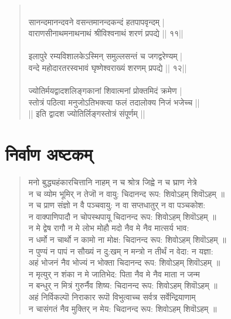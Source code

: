 \begin{quotation}
\\
सानन्दमानन्दवने वसन्तमानन्दकन्दं हतपापवृन्दम् |\\
वाराणसीनाथमनाथनाथं श्रीविश्वनाथं शरणं प्रपद्ये || ११||\\
\\
इलापुरे रम्यविशालकेऽस्मिन् समुल्लसन्तं च जगद्वरेण्यम् |\\
वन्दे महोदारतरस्वभावं घृष्णेश्वराख्यं शरणम् प्रपद्ये || १२||\\
\\
ज्योतिर्मयद्वादशलिङ्गकानां शिवात्मनां प्रोक्तमिदं क्रमेण |\\
स्तोत्रं पठित्वा मनुजोऽतिभक्त्या फलं तदालोक्य निजं भजेच्च ||\\
|| इति द्वादश ज्योतिर्लिङ्गस्तोत्रं संपूर्णम् ||\\
\end{quotation}

\section{\sanskrit निर्वाण अष्टकम् }
\begin{quotation}\chandas
मनो बुद्ध्यहंकारचित्तानि नाहम् न च श्रोत्र जिह्वे न च घ्राण नेत्रे \\
न च व्योम भूमिर् न तेजॊ न वायु: चिदानन्द रूप: शिवोऽहम् शिवॊऽहम् ॥\\ 
न च प्राण संज्ञो न वै पञ्चवायु: न वा सप्तधातुर् न वा पञ्चकोश: \\
न वाक्पाणिपादौ न चोपस्थपायू चिदानन्द रूप: शिवोऽहम् शिवॊऽहम् ॥ \\
न मे द्वेष रागौ न मे लोभ मोहौ मदो नैव मे नैव मात्सर्य भाव: \\
न धर्मो न चार्थो न कामो ना मोक्ष: चिदानन्द रूप: शिवोऽहम् शिवॊऽहम् ॥\\ 
न पुण्यं न पापं न सौख्यं न दु:खम् न मन्त्रो न तीर्थं न वेदा: न यज्ञा: \\
अहं भोजनं नैव भोज्यं न भोक्ता चिदानन्द रूप: शिवोऽहम् शिवॊऽहम् ॥\\ 
न मृत्युर् न शंका न मे जातिभेद: पिता नैव मे नैव माता न जन्म \\
न बन्धुर् न मित्रं गुरुर्नैव शिष्य: चिदानन्द रूप: शिवोऽहम् शिवॊऽहम् ॥\\ 
अहं निर्विकल्पॊ निराकार रूपॊ विभुत्वाच्च सर्वत्र सर्वेन्द्रियाणाम् \\
न चासंगतं नैव मुक्तिर् न मेय: चिदानन्द रूप: शिवोऽहम् शिवॊऽहम् ॥\\
\end{quotation}

